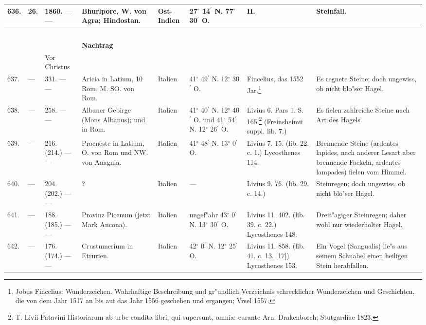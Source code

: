 \documentclass[a4paper, 8pt, oneside, polutonikogreek, german]{article}
\begin{document}
\begin{center}
\begin{longtable}{| p{4mm} | p{2mm} | p{15mm} | p{25mm} | p{16mm} | p{12mm} | p{13mm} | p{20mm} |}
        636. & 26. & 1860. --- --- & Bhurlpore, W. von Agra; Hindostan. & Ost-Indien & 27$^\circ$ 14$^\prime$ N. 77$^\circ$ 30$^\prime$ O. & H. & Steinfall. \\ \hline
         ~ & ~ & ~&   &   &   &   &   \\
        ~ & ~ & ~ & \textbf{Nachtrag} &   &   &   &   \\ \hline
         ~ & ~ & Vor Christus &   &   &   &   &   \\ \hline
        637. & --- & 331. --- --- & Aricia in Latium, 10 Rom. M. SO. von Rom. & Italien & 41$^\circ$ 49$^\prime$ N. 12$^\circ$ 30$^\prime$ O. & Fincelius, das 1552 Jar.\footnote{Jobus Fincelius: Wunderzeichen. Wahrhaftige Beschreibung und gr"undlich Verzeichnis schrecklicher Wunderzeichen und Geschichten, die von dem Jahr 1517 an bis auf das Jahr 1556 geschehen und ergangen; Vrsel 1557.} & Es regnete Steine; doch ungewiss, ob nicht blo"ser Hagel. \\ \hline
        638. & --- & 258. --- --- & Albaner Gebirge (Mons Albanus); und in Rom. & Italien & 41$^\circ$ 40$^\prime$ N. 12$^\circ$ 40$^\prime$ O. und 41$^\circ$ 54$^\prime$ N. 12$^\circ$ 26$^\prime$ O. & Livius 6. Pars 1. S. 165.\footnote{T. Livii Patavini Historiarum ab urbe condita libri, qui supersunt, omnia: curante Arn. Drakenborch; Stutgardiae 1823.} (Freinsheimii suppl. lib. 7.) & Es fielen zahlreiche Steine nach Art des Hagels. \\ \hline
        639. & --- & 216. (214.) --- --- & Praeneste in Latium, O. von Rom und NW. von Anagnia. & Italien & 41$^\circ$ 48$^\prime$ N. 13$^\circ$ 0$^\prime$ O. & Livius 7. 15. (lib. 22. c. 1.) Lycosthenes 114. & Brennende Steine (ardentes lapides, nach anderer Lesart aber brennende Fackeln, ardentes lampades) fielen vom Himmel. \\ \hline
        640. & --- & 204. (202.) --- --- & ? & Italien & --- & Livius 9. 76. (lib. 29. c. 14.) & Steinregen; doch ungewiss, ob nicht blo"ser Hagel. \\ \hline
        641. & --- & 188. (185.) --- --- & Provinz Picenum (jetzt Mark Ancona). & Italien & ungef"ahr 43$^\circ$ 0$^\prime$ N. 13$^\circ$ 30$^\prime$ O. & Livius 11. 402. (lib. 39. c. 22.) Lycosthenes 148. & Dreit"agiger Steinregen; daher wohl nur wiederholter Hagel. \\ \hline
        642. & --- & 176. (174.) --- --- & Crustumerium in Etrurien. & Italien & 42$^\circ$ 0$^\prime$ N. 12$^\circ$ 25$^\prime$ O. & Livius 11. 858. (lib. 41. c. 13. [17]) Lycosthenes 153. & Ein Vogel (Sangualis) lie"s aus seinem Schnabel einen heiligen Stein herabfallen. \\ \hline

\end{longtable}
\end{center}
\end{document}
